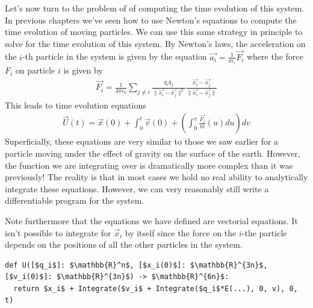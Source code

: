 \documentclass[book.tex]{subfiles}
\begin{document}
Let's now turn to the problem of of computing the time evolution of this system. In previous chapters we've seen how to use Newton's equations to compute the time evolution of moving particles. We can use this same strategy in principle to solve for the time evolution of this system. By Newton's laws, the acceleration on the $i$-th particle in the system is given by the equation $\vec{a_i} = \frac{1}{m_i} \vec{F_i}$ where the force $F_i$ on particle $i$ is given by
\begin{align}
\vec{F_i} = \frac{1}{4 \pi \epsilon_0} \sum_{j \neq i} \frac{q_iq_j}{\|\vec{x_i} - \vec{x_j}\|^2} \frac{\vec{x_i} - \vec{x_j}}{\|\vec{x_i} - \vec{x_j}\|}
\end{align}
This leads to time evolution equations
\begin{align}
\vec{U}(t) = \vec{x}(0) + \int_0^t \vec{v}(0) + \left (\int_0^v \frac{\vec{F_i}}{m}(u) du \right ) dv
\end{align}
Superficially, these equations are very similar to those we saw earlier for a particle moving under the effect of gravity on the surface of the earth. However, the function we are integrating over is dramatically more complex than it was previously! The reality is that in most cases we hold no real ability to analytically integrate these equations. However, we can very reasonably still write a differentiable program for the system.

Note furthermore that the equations we have defined are vectorial equations. It isn't possible to integrate for $\vec{x}_i$ by itself since the force on the $i$-the particle depends on the positions of all the other particles in the system. 

\begin{lstlisting}
def U([$q_i$]: $\mathbb{R}^n$, [$x_i(0)$]: $\mathbb{R}^{3n}$, [$v_i(0)$]: $\mathbb{R}^{3n}$) -> $\mathbb{R}^{6n}$:
  return $x_i$ + Integrate($v_i$ + Integrate($q_i$*E(...), 0, v), 0, t)
\end{lstlisting}
\end{document}
